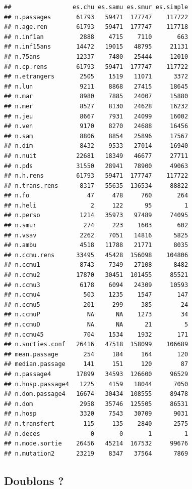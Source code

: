 \documentclass[]{article}
\begin{document}
\begin{verbatim}
##                 es.chu es.samu es.smur es.simple
## n.passages       61793   59471  177747    117722
## n.age.ren        61793   59471  177747    117718
## n.inf1an          2888    4715    7110       663
## n.inf15ans       14472   19015   48795     21131
## n.75ans          12337    7480   25444     12010
## n.cp.rens        61793   59471  177747    117722
## n.etrangers       2505    1519   11071      3372
## n.lun             9211    8868   27415     18645
## n.mar             8980    7885   24007     15880
## n.mer             8527    8130   24628     16232
## n.jeu             8667    7931   24099     16002
## n.ven             9170    8270   24688     16456
## n.sam             8806    8854   25896     17567
## n.dim             8432    9533   27014     16940
## n.nuit           22681   18349   46677     27711
## n.pds            31550   28941   78900     49063
## n.h.rens         61793   59471  177747    117722
## n.trans.rens      8317   55635  136534     88822
## n.fo                47     478     760       264
## n.heli               2     122      95         1
## n.perso           1214   35973   97489     74095
## n.smur             274     223    1603       602
## n.vsav            2262    7051   14816      5825
## n.ambu            4518   11788   21771      8035
## n.ccmu.rens      33495   45428  156098    104806
## n.ccmu1           8743    7349   27108      8482
## n.ccmu2          17870   30451  101455     85521
## n.ccmu3           6178    6094   24309     10593
## n.ccmu4            503    1235    1547       147
## n.ccmu5            201     299     385        24
## n.ccmuP             NA      NA    1273        34
## n.ccmuD             NA      NA      21         5
## n.ccmu45           704    1534    1932       171
## n.sorties.conf   26416   47518  158099    106689
## mean.passage       254     184     164       120
## median.passage     141     151     120        87
## n.passage4       17899   34593  126600     96529
## n.hosp.passage4   1225    4159   18044      7050
## n.dom.passage4   16674   30434  108555     89478
## n.dom             2958   35746  125505     86531
## n.hosp            3320    7543   30709      9031
## n.transfert        115     135    2840      2575
## n.deces              0       0       1         1
## n.mode.sortie    26456   45214  167532     99676
## n.mutation2      23219    8347   37564      7869
\end{verbatim}

\subsection{Doublons ?}\label{doublons}
\end{document}

